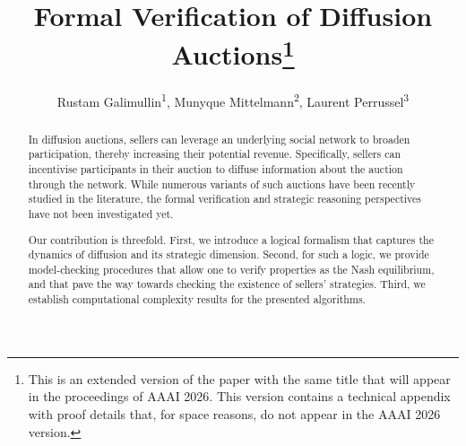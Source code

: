 \documentclass[letterpaper]{article} %
\title{Formal Verification of Diffusion Auctions\thanks{This is an extended version of the paper with the same title that will appear in the proceedings of AAAI 2026. This version contains a technical appendix with proof details that, for space reasons, do not appear in the AAAI 2026 version.}
}
\author{ 
   Rustam Galimullin\textsuperscript{\rm 1}, Munyque Mittelmann\textsuperscript{\rm 2},  Laurent Perrussel\textsuperscript{\rm 3}
}
\theoremstyle{definition}
\newcommand{\laurent}[1]{{[\color{purple}#1]}}
\begin{document}
\maketitle

\begin{abstract}

In diffusion auctions, sellers can leverage an underlying social network to broaden participation, thereby increasing their potential revenue. %
Specifically, sellers can incentivise participants in their auction to diffuse information about the auction through the network. While numerous variants of such auctions have been recently studied in the literature, the formal verification and strategic reasoning perspectives have not been investigated yet.   

Our contribution is threefold. First, we introduce a logical formalism that captures the dynamics of diffusion and its strategic dimension. Second, for such a logic, we provide model-checking procedures that allow one to verify properties as the Nash equilibrium, and that pave the way towards checking the existence of sellers' strategies. Third, we establish computational complexity results for the presented algorithms. %
\end{abstract}
\end{document}
